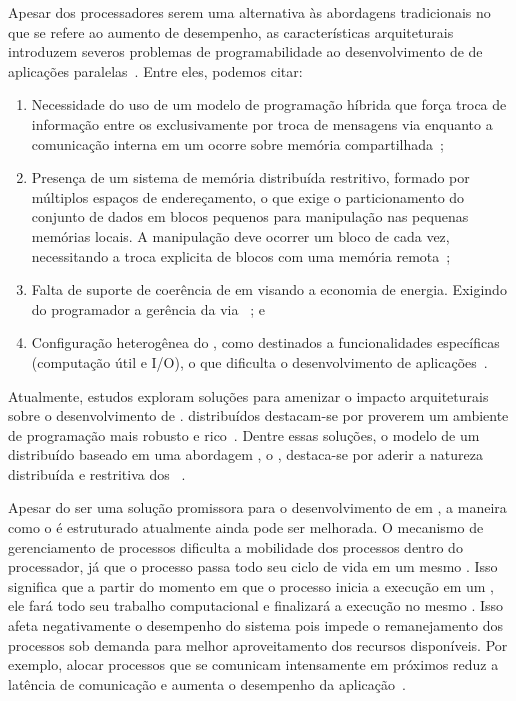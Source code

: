 Apesar dos processadores \lws serem uma alternativa às abordagens tradicionais no que se refere ao aumento de desempenho, as características arquiteturais introduzem severos problemas de programabilidade ao desenvolvimento de \software de aplicações paralelas~\cite{Castro-PARCO:2016}. Entre eles, podemos citar:

\begin{enumerate}[label= (\roman*)]
    \item Necessidade do uso de um modelo de programação híbrida que força troca de informação entre os \clusters exclusivamente por troca de mensagens via \noc enquanto a comunicação interna em um \cluster ocorre sobre memória compartilhada~\cite{kelly2013};
    \item Presença de um sistema de memória distribuída restritivo, formado por múltiplos espaços de endereçamento, o que exige o particionamento do conjunto de dados em blocos pequenos para manipulação nas pequenas memórias locais. A manipulação deve ocorrer um bloco de cada vez, necessitando a troca explicita de blocos com uma memória remota~\cite{Castro-PARCO:2016};
    \item Falta de suporte de coerência de \cache em \hardware visando a economia de energia. Exigindo do programador a gerência da \cache via \software~\cite{francesquini2015}; e
    \item Configuração heterogênea do \hardware, como \clusters destinados a funcionalidades específicas (computação útil e I/O), o que dificulta o desenvolvimento de aplicações~\cite{barbalace2015popcorn}.
\end{enumerate}

Atualmente, estudos exploram soluções para amenizar o impacto arquiteturais sobre o desenvolvimento de \software. \oss distribuídos destacam-se por proverem um ambiente de programação mais robusto e rico~\cite{asmussen_m3:_2016, kluge_operating_2014, penna:sbesc19}. Dentre essas soluções, o modelo de um \os distribuído baseado em uma abordagem \multikernel, o \nanvix, destaca-se por aderir a natureza distribuída e restritiva dos \lws~\cite{penna2017-2,penna2019}.

Apesar do \nanvix ser uma solução promissora para o desenvolvimento de \software em \lws, a maneira como o \os é estruturado atualmente ainda pode ser melhorada. O mecanismo de gerenciamento de processos dificulta a mobilidade dos processos dentro do processador, já que o processo passa todo seu ciclo de vida em um mesmo \cluster. Isso significa que a partir do momento em que o processo inicia a execução em um \cluster, ele fará todo seu trabalho computacional e finalizará a execução no mesmo \cluster. Isso afeta negativamente o desempenho do sistema pois impede o remanejamento dos processos sob demanda para melhor aproveitamento dos recursos disponíveis. Por exemplo, alocar processos que se comunicam intensamente em \clusters próximos reduz a latência de comunicação e aumenta o desempenho da aplicação~\cite{vanz2022virtualizaccao}.

